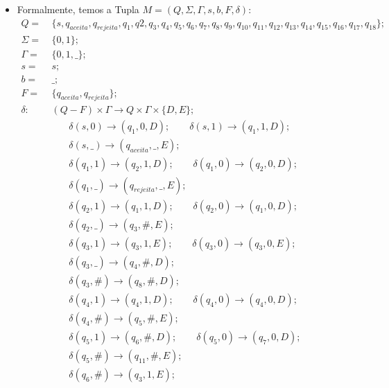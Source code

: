 \documentclass{homework}
\begin{document}
	\begin{itemize}
		\item Formalmente, temos a Tupla $M = (Q,\Sigma,\Gamma,s,b,F,\delta)$:
		\begin{align*}
			Q = &\ \{s, q_{aceita}, q_{rejeita}, q_{1}, q{2}, q_{3}, q_{4}, q_{5}, q_{6}, q_{7}, q_{8}, q_{9}, q_{10}, q_{11}, q_{12}, q_{13}, q_{14}, q_{15}, q_{16}, q_{17}, q_{18}\};\\
			\Sigma = &\ \{0,1\};\\
			\Gamma = &\ \{0,1,\_\};\\
			s = &\ s;\\
			b = &\ \_;\\
			F = &\ \{q_{aceita}, q_{rejeita}\};\\
			\delta :\ &\ (Q - F) \times \Gamma \rightarrow Q \times \Gamma \times \{D,E\};\\
			&\qquad \delta(s,0) \rightarrow (q_1,0,D);
			\qquad \delta(s,1) \rightarrow (q_1,1,D);\\
			&\qquad \delta(s,\_) \rightarrow (q_{aceita},\_,E);\\
			&\qquad \delta(q_1,1) \rightarrow (q_2,1,D);
			\qquad \delta(q_1,0) \rightarrow (q_2,0,D);\\
			&\qquad \delta(q_1,\_) \rightarrow (q_{rejeita},\_,E);\\		
			&\qquad \delta(q_2,1) \rightarrow (q_1,1,D);
			\qquad \delta(q_2,0) \rightarrow (q_1,0,D);\\
			&\qquad \delta(q_2,\_) \rightarrow (q_3,\#,E);\\
			&\qquad \delta(q_3,1) \rightarrow (q_3,1,E);
			\qquad \delta(q_3,0) \rightarrow (q_3,0,E);\\
			&\qquad \delta(q_3,\_) \rightarrow (q_4,\#,D);\\
			&\qquad \delta(q_3,\#) \rightarrow (q_8,\#,D);\\
			&\qquad \delta(q_4,1) \rightarrow (q_4,1,D);
			\qquad \delta(q_4,0) \rightarrow (q_4,0,D);\\
			&\qquad \delta(q_4,\#) \rightarrow (q_5,\#,E);\\
			&\qquad \delta(q_5,1) \rightarrow (q_6,\#,D);
			\qquad \delta(q_5,0) \rightarrow (q_7,0,D);\\
			&\qquad \delta(q_5,\#) \rightarrow (q_{11},\#,E);\\
			&\qquad \delta(q_6,\#) \rightarrow (q_3,1,E);\\

\end{align*}
\end{itemize}
\end{document}
